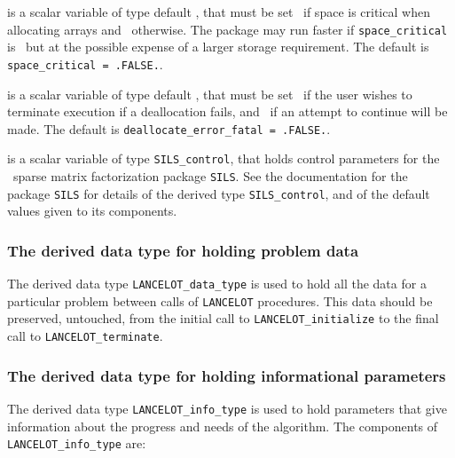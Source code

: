\documentclass{galahad}
\newcommand{\fullpackagename}{LANC\-E\-LOT}
\begin{document}
\begin{description}
 is a scalar variable of type default \logical,
that must be set \true\ if space is critical when allocating arrays
and  \false\ otherwise. The package may run faster if
{\tt space\_critical} is \false\ but at the possible expense of a larger
storage requirement. The default is {\tt space\_critical = .FALSE.}.

 is a scalar variable of type default \logical,
that must be set \true\ if the user wishes to terminate execution if
a deallocation  fails, and \false\ if an attempt to continue
will be made. The default is {\tt deallocate\_error\_fatal = .FALSE.}.

 is a scalar variable of type {\tt SILS\_control}, that holds
control parameters for the \galahad\ sparse matrix factorization package
{\tt SILS}. See the documentation for the package {\tt SILS} for details of the
derived type {\tt SILS\_control}, and of the default values given to
its components.

\end{description}


\subsubsection{The derived data type for holding problem data}\label{typedata}
The derived data type
{\tt \fullpackagename\_data\_type}
is used to hold all the data for a particular problem between calls of
{\tt \fullpackagename} procedures.
This data should be preserved, untouched, from the initial call to
{\tt \fullpackagename\_initialize}
to the final call to
{\tt \fullpackagename\_terminate}.


\subsubsection{The derived data type for holding informational
 parameters}\label{typeinfo}
The derived data type
{\tt \fullpackagename\_info\_type}
is used to hold parameters that give information about the progress and needs
of the algorithm. The components of
{\tt \fullpackagename\_info\_type}
are:
\end{document}
